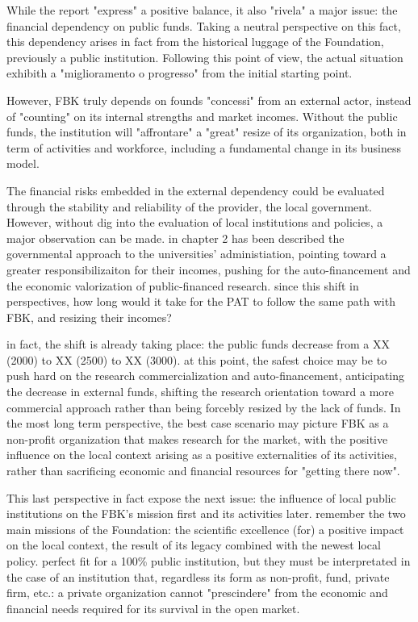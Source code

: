 While the report "express" a positive balance, it also "rivela" a major issue: the financial dependency on public funds. Taking a neutral perspective on this fact, this dependency arises in fact from the historical luggage of the Foundation, previously a public institution. Following this point of view, the actual situation exhibith a "miglioramento o progresso" from the initial starting point. 

However, FBK truly depends on founds "concessi" from an external actor, instead of "counting" on its internal strengths and market incomes. Without the public funds, the institution will "affrontare" a "great" resize of its organization, both in term of activities and workforce, including a fundamental change in its business model. 

The financial risks embedded in the external dependency could be evaluated through the stability and reliability of the provider, the local government. However, without dig into the evaluation of local institutions and policies, a major observation can be made. in chapter 2 has been described the governmental approach to the universities' administiation, pointing toward a greater responsibilizaiton for their incomes, pushing for the auto-financement and the economic valorization of public-financed research. since this shift in perspectives, how long would it take for the PAT to follow the same path with FBK, and resizing their incomes?

in fact, the shift is already taking place: the public funds decrease from a XX (2000) to XX (2500) to XX (3000). at this point, the safest choice may be to push hard on the research commercialization and auto-financement, anticipating the decrease in external funds, shifting the research orientation toward a more commercial approach rather than being forcebly resized by the lack of funds. In the most long term perspective, the best case scenario may picture FBK as a non-profit organization that makes research for the market, with the positive influence on the local context arising as a positive externalities of its activities, rather than sacrificing economic and financial resources for "getting there now".

This last perspective in fact expose the next issue: the influence of local public institutions on the FBK's mission first and its activities later. remember the two main missions of the Foundation: the scientific excellence (for) a positive impact on the local context, the result of its legacy combined with the newest local policy. perfect fit for a 100\% public institution, but they must be interpretated in the case of an institution that, regardless its form as non-profit, fund, private firm, etc.: a private organization cannot "prescindere" from the economic and financial needs required for its survival in the open market. 

